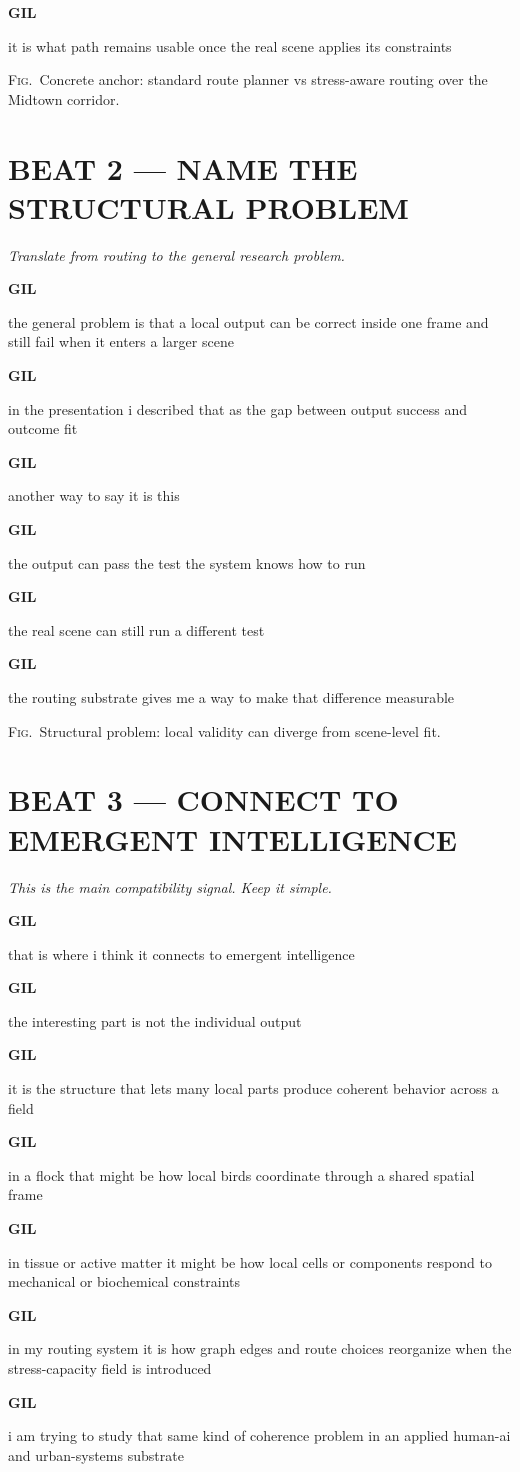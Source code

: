 \documentclass[11pt,letterpaper]{article}
\newcommand{\gil}[1]{\par\smallskip\textbf{GIL}\par #1}
\newcommand{\context}[1]{\textit{#1}\par\smallskip}
\newcommand{\figdesc}[1]{\par\smallskip\textsc{Fig.}\ #1\par}
\begin{document}
\gil{it is what path remains usable once the real scene applies its constraints}

\figdesc{Concrete anchor: standard route planner vs stress-aware routing over the Midtown corridor.}

\section*{BEAT 2 --- NAME THE STRUCTURAL PROBLEM}

\context{Translate from routing to the general research problem.}

\gil{the general problem is that a local output can be correct inside one frame and still fail when it enters a larger scene}

\gil{in the presentation i described that as the gap between output success and outcome fit}

\gil{another way to say it is this}

\gil{the output can pass the test the system knows how to run}

\gil{the real scene can still run a different test}

\gil{the routing substrate gives me a way to make that difference measurable}

\figdesc{Structural problem: local validity can diverge from scene-level fit.}

\section*{BEAT 3 --- CONNECT TO EMERGENT INTELLIGENCE}

\context{This is the main compatibility signal. Keep it simple.}

\gil{that is where i think it connects to emergent intelligence}

\gil{the interesting part is not the individual output}

\gil{it is the structure that lets many local parts produce coherent behavior across a field}

\gil{in a flock that might be how local birds coordinate through a shared spatial frame}

\gil{in tissue or active matter it might be how local cells or components respond to mechanical or biochemical constraints}

\gil{in my routing system it is how graph edges and route choices reorganize when the stress-capacity field is introduced}

\gil{i am trying to study that same kind of coherence problem in an applied human-ai and urban-systems substrate}
\end{document}
